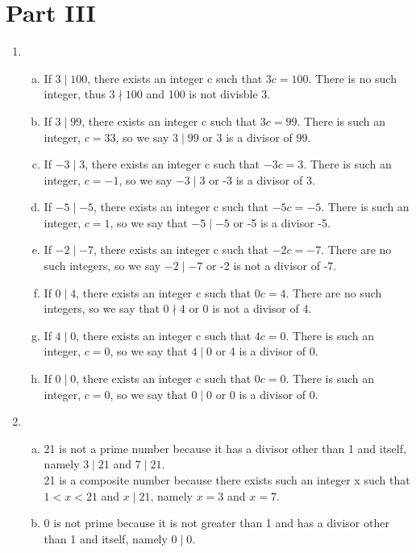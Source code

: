 \documentclass{article}
\begin{document}
\section*{Part III}
\begin{enumerate}[label=(3.\arabic*),start=1]
    \item
        \begin{enumerate}[(a)]
            \item If $3\mid100$, there exists an integer c such that $3c=100$. There is no such integer, thus $3\nmid100$ and 100 is not divisble 3.
            \item If $3\mid99$, there exists an integer c such that $3c=99$. There is such an integer, $c=33$, so we say $3\mid99$ or 3 is a divisor of 99.
            \item If $-3\mid3$, there exists an integer c such that $-3c=3$. There is such an integer, $c=-1$, so we say $-3\mid3$ or -3 is a divisor of 3.
            \item If $-5\mid-5$, there exists an integer c such that $-5c=-5$. There is such an integer, $c=1$, so we say that $-5\mid-5$ or -5 is a divisor -5.
            \item If $-2\mid-7$, there exists an integer c such that $-2c=-7$. There are no such integers, so we say $-2\mid-7$ or -2 is not a divisor of -7.
            \item If $0\mid4$, there exists an integer c such that $0c=4$. There are no such integers, so we say that $0\nmid4$ or 0 is not a divisor of 4.
            \item If $4\mid0$, there exists an integer c such that $4c=0$. There is such an integer, $c=0$, so we say that $4\mid0$ or 4 is a divisor of 0.
            \item If $0\mid0$, there exists an integer c such that $0c=0$. There is such an integer, $c=0$, so we say that $0\mid0$ or 0 is a divisor of 0.
        \end{enumerate}
    \addtocounter{enumi}{1}
    \item
        \begin{enumerate}[(a)]
            \item 21 is not a prime number because it has a divisor other than 1 and itself, namely $3\mid21$ and $7\mid21$.\\
                  21 is a composite number because there exists such an integer x such that $1<x<21$ and $x\mid21$, namely $x=3$ and $x=7$.
            \item 0 is not prime because it is not greater than 1 and has a divisor other than 1 and itself, namely $0\mid0$.\\

\end{enumerate}
\end{enumerate}
\end{document}
